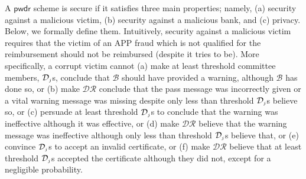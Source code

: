 A $\mathsf{pwdr}$ scheme is  secure if it satisfies three main properties; namely, (a) security against a malicious victim, (b) security against a malicious bank, and (c) privacy. Below, we formally define  them. Intuitively, security against a malicious victim requires that the victim of an APP fraud which is not qualified for the reimbursement should not be reimbursed  (despite  it tries to be). More specifically, a corrupt victim cannot (a) make at least threshold committee members, $\mathcal{D}_{\scriptscriptstyle j}$s,  conclude that $\mathcal{B}$ should have provided a warning, although $\mathcal{B}$ has done so, or (b) make $\mathcal{DR}$ conclude that   the pass message was incorrectly given or a vital warning message was missing despite only less than threshold  $\mathcal{D}_{\scriptscriptstyle j}$s  believe so, or (c) persuade at least threshold $\mathcal{D}_{\scriptscriptstyle j}$s to  conclude that the warning was ineffective although it was effective, or (d)  make $\mathcal{DR}$ believe that the warning message was ineffective although only less than threshold $\mathcal{D}_{\scriptscriptstyle j}$s   believe that, or (e)  convince  $\mathcal{D}_{\scriptscriptstyle j}$s to accept an invalid certificate, or  (f) make $\mathcal{DR}$ believe that at least  threshold $\mathcal{D}_{\scriptscriptstyle j}$s accepted the certificate  although they did not, except for a negligible probability. 









